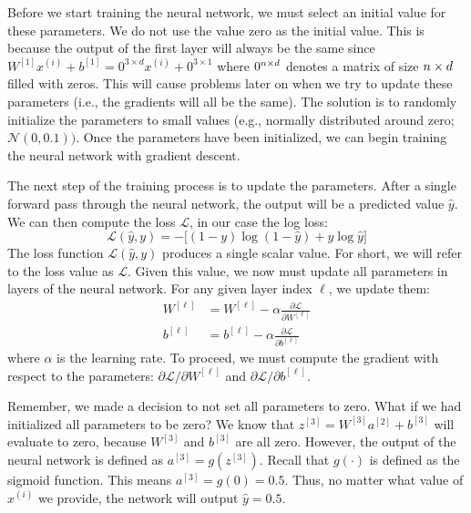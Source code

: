 \documentclass{article}
\numberwithin{equation}{section}
\begin{document}
Before we start training the neural network, we must select an initial value for these parameters.
We do not use the value zero as the initial value.
This is because the output of the first layer will always be the same since $  W^{[1]} x^{(i)} + b^{[1]} = 0^{3 \times d} x^{(i)} + 0^{3 \times 1}$ where $0^{{n} \times {d}}$ denotes a matrix of size ${n} \times {d}$ filled with zeros.
This will cause problems later on when we try to update these parameters (i.e., the gradients will all be the same).
The solution is to randomly initialize the parameters to small values (e.g., normally distributed around zero; $\mathcal{N}(0, 0.1))$.
Once the parameters have been initialized, we can begin training the neural network with gradient descent.

The next step of the training process is to update the parameters.
After a single forward pass through the neural network, the output will be a predicted value $\hat{y}$.
We can then compute the loss $\mathcal{L}$, in our case the log loss:
\begin{equation}
\mathcal{L}(\hat{y}, y) = -\bigg[(1-y) \log(1 - \hat{y}) + y \log \hat{y}\bigg]
\end{equation}
The loss function $\mathcal{L}(\hat{y}, y)$ produces a single scalar value. For short, we will refer to the loss value as $\mathcal{L}$.
Given this value, we now must update all parameters in layers of the neural network.
For any given layer index $\ell$, we update them:
\begin{align}\label{eq:dW}
W^{[\ell]} &= W^{[\ell]} - \alpha \frac{\partial \mathcal{L}}{\partial W^{[\ell]}} \\ \label{eq:db}
b^{[\ell]} &= b^{[\ell]} - \alpha \frac{\partial \mathcal{L}}{\partial b^{[\ell]}}
\end{align}
where $\alpha$ is the learning rate. To proceed, we must compute the gradient with respect to the parameters: $\partial \mathcal{L}/\partial W^{[\ell]}$ and $\partial \mathcal{L} / \partial b^{[\ell]}$.

Remember, we made a decision to not set all parameters to zero.
What if we had initialized all parameters to be zero?
We know that $z^{[3]} = W^{[3]} a^{[2]} + b^{[3]}$ will evaluate to zero, because $W^{[3]}$ and $b^{[3]}$ are all zero.
However, the output of the neural network is defined as $a^{[3]} = g(z^{[3]})$.
Recall that $g(\cdot)$ is defined as the sigmoid function. This means $a^{[3]}=  g(0)=0.5$.
Thus, no matter what value of $x^{(i)}$ we provide, the network will output $\hat{y} = 0.5$.
\end{document}
